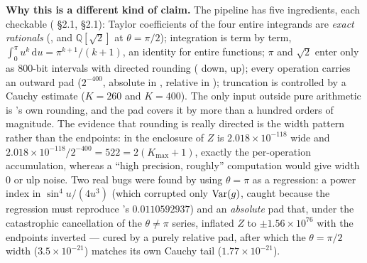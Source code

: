 \noindent
\textbf{Why this is a different kind of claim.} The pipeline has five ingredients, each checkable
( \S2.1,  \S2.1): Taylor coefficients of the four entire
integrands are \emph{exact rationals} (, and $\mathbb{Q}[\sqrt2]$ at $\theta=\pi/2$);
integration is term by term, $\int_{0}^{\pi}u^{k}\,\mathrm{d}u=\pi^{k+1}/(k+1)$, an identity for entire
functions; $\pi$ and $\sqrt2$ enter only as $800$-bit  intervals with directed rounding
( down,  up); every operation carries an outward pad ($2^{-400}$, absolute in
, relative in ); truncation is controlled by a Cauchy estimate ($K=260$ and
$K=400$). The only input outside pure arithmetic is 's own rounding, and the pad covers it
by more than a hundred orders of magnitude. The evidence that rounding is really directed is the width
pattern rather than the endpoints: in  the enclosure of $Z$ is $2.018\times10^{-118}$ wide and
$2.018\times10^{-118}/2^{-400}=522=2(K_{\max}+1)$, exactly the per-operation accumulation, whereas a
``high precision, roughly'' computation would give width $0$ or ulp noise. Two real bugs were found by
using $\theta=\pi$ as a regression: a power index in $\sin^{4}u/(4u^{3})$ (which corrupted only
$\operatorname{Var}(g)$, caught because the regression must reproduce 's $0.0110592937$) and an
\emph{absolute} pad that, under the catastrophic cancellation of the $\theta\neq\pi$ series, inflated
$Z$ to $\pm1.56\times10^{76}$ with the endpoints inverted --- cured by a purely relative pad, after
which the $\theta=\pi/2$ width ($3.5\times10^{-21}$) matches its own Cauchy tail
($1.77\times10^{-21}$). \LT
{}


